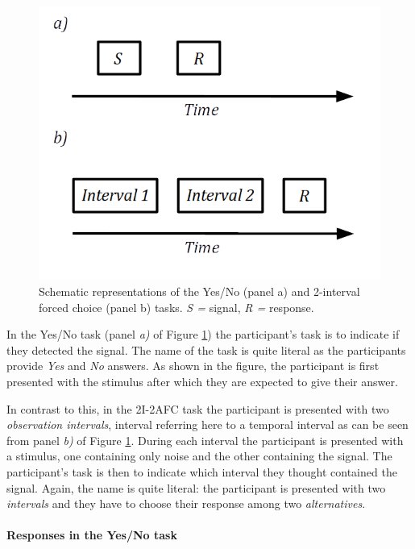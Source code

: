 \documentclass{article}\usepackage{knitr}
\begin{document}
\begin{figure}[!htb]
\centering
\includegraphics[scale = 0.5]{YesNoAfc}
\caption{Schematic representations of the Yes/No (panel a) and 2-interval forced choice (panel b) tasks. \textit{S = } signal, \textit{R =} response.}
\label{fig:YesNoAfc}
\end{figure}

In the Yes/No task (panel \textit{a)} of Figure \ref{fig:YesNoAfc}) the participant's task is to indicate if they detected the signal. The name of the task is quite literal as the participants provide \textit{Yes} and \textit{No} answers. As shown in the figure, the participant is first presented with the stimulus after which they are expected to give their answer.

In contrast to this, in the 2I-2AFC task the participant is presented with two \textit{observation intervals}, interval referring here to a temporal interval as can be seen from panel \textit{b)} of Figure \ref{fig:YesNoAfc}. During each interval the participant is presented with a stimulus, one containing only noise and the other containing the signal. The participant's task is then to indicate which interval they thought contained the signal. Again, the name is quite literal: the participant is presented with two \textit{intervals} and they have to choose their response among two \textit{alternatives}.

\paragraph{Responses in the Yes/No task}
\end{document}
